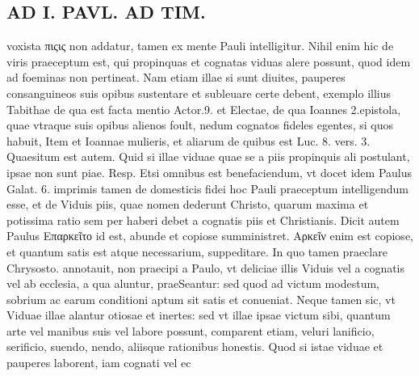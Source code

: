 \documentclass{article}
\begin{document}
\begin{pages}
\section*{AD I. PAVL. AD TIM. }
\marginpar{[ p.302 ]}\pstart voxista πιςις non addatur, tamen ex mente Pauli intelligitur. Nihil enim hic de viris praeceptum est, qui propinquas et cognatas viduas alere possunt, quod idem ad foeminas non pertineat. Nam etiam illae si sunt diuites, pauperes consanguineos suis opibus sustentare et subleuare certe debent, exemplo illius Tabithae de qua est facta mentio Actor.9. et Electae, de qua Ioannes 2.epistola, quae vtraque suis opibus alienos foult, nedum cognatos fideles egentes, si quos habuit, Item et Ioannae mulieris, et aliarum de quibus est Luc. 8. vers. 3. Quaesitum est autem. Quid si illae viduae quae se a piis propinquis ali postulant, ipsae non sunt piae. Resp. Etsi omnibus est benefaciendum, vt docet idem Paulus Galat. 6. imprimis tamen de domesticis fidei hoc Pauli praeceptum intelligendum esse, et de Viduis piis, quae nomen dederunt Christo, quarum maxima et potissima ratio sem per haberi debet a cognatis piis et Christianis. Dicit autem Paulus Επαρκεῖτο id est, abunde et copiose sumministret. Αρκεῖν enim est copiose, et quantum satis est atque necessarium, suppeditare. In quo tamen praeclare Chrysosto. annotauit, non praecipi a Paulo, vt deliciae illis Viduis vel a cognatis vel ab ecclesia, a qua aluntur, praeSeantur: sed quod ad victum modestum, sobrium ac earum conditioni aptum sit satis et conueniat. Neque tamen sic, vt Viduae illae alantur otiosae et inertes: sed vt illae ipsae victum sibi, quantum arte vel manibus suis vel labore possunt, comparent etiam, veluri lanificio, serificio, suendo, nendo, aliisque rationibus honestis. Quod si istae viduae et pauperes laborent, iam cognati vel ec\pend

\end{pages}
\end{document}
